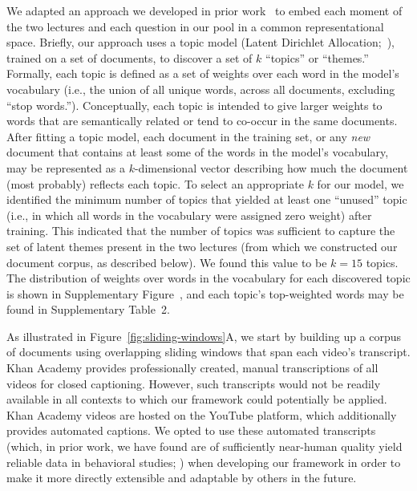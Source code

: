 \documentclass[10pt]{article}
\newcommand{\topics}{2}
\begin{document}
We adapted an approach we developed in prior work~\citep{HeusEtal21} to embed
each moment of the two lectures and each question in our pool in a common
representational space. Briefly, our approach uses a topic model (Latent
Dirichlet Allocation;~\citealp{BleiEtal03}), trained on a set of documents, to
discover a set of $k$ ``topics'' or ``themes.'' Formally, each topic is defined
as a set of weights over each word in the model's vocabulary (i.e., the union
of all unique words, across all documents, excluding ``stop words.'').
Conceptually, each topic is intended to give larger weights to words that are
semantically related or tend to co-occur in the same documents. After
fitting a topic model, each document in the training set, or any \textit{new}
document that contains at least some of the words in the model's vocabulary,
may be represented as a $k$-dimensional vector describing how much the document
(most probably) reflects each topic.
To select an appropriate $k$ for our model, we identified the minimum number of
topics that yielded at least one ``unused'' topic (i.e., in which all words in the vocabulary
were assigned zero weight) after training. This indicated that the number of topics was
sufficient to capture the set of latent themes present in the two lectures (from which we
constructed our document corpus, as described below). We found this value to be $k = 15$
topics. The distribution of weights over words in the vocabulary for each discovered topic is
shown in Supplementary Figure~\topicWordWeights, and each topic's top-weighted
words may be found in Supplementary Table~\topics.

As illustrated in Figure~\ref{fig:sliding-windows}A, we start by building up a
corpus of documents using overlapping sliding windows that span each video's
transcript. Khan Academy provides professionally created, manual transcriptions
of all videos for closed captioning. However, such transcripts would not be
readily available in all contexts to which our framework could potentially be
applied. Khan Academy videos are hosted on the YouTube platform, which
additionally provides automated captions. We opted to use these automated
transcripts (which, in prior work, we have found are of sufficiently near-human
quality yield reliable data in behavioral studies; \citealp{ZimaEtal18}) when
developing our framework in order to make it more directly extensible and
adaptable by others in the future.
\end{document}
